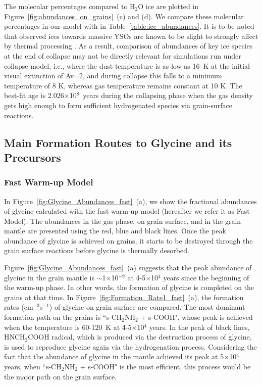 \documentclass{aastex61}
\begin{document}
The molecular percentages compared to H$_2$O ice are plotted in Figure~\ref{fig:abundances_on_grains}~(c) and (d).
%
We compare these molecular percentages in our model with \cite{Boogert15} in Table~\ref{table:ice_abundances}.
%
It is to be noted that observed ices towards massive YSOs are known to be slight to strongly affect by thermal processing \cite{Boogert15}.
%
As a result, comparison of abundances of key ice species at the end of collapse may not be directly relevant for simulations run under collapse model, i.e., where the dust temperature is as low as 16~K at the initial visual extinction of Av=2, and during collapse this falls to a minimum temperature of 8 K, whereas gas temperature remains constant at 10 K.
%
The best-fit age is 2.026$\times$10$^8$~years during the collapsing phase when the gas density gets high enough to form sufficient hydrogenated species via grain-surface reactions.






\subsection{Main Formation Routes to Glycine and its Precursors}
\subsubsection{Fast Warm-up Model}
%
In Figure~\ref{fig:Glycine_Abundances_fast}~(a), we show the fractional abundances of glycine calculated with the fast warm-up model (hereafter we refer it as Fast Model).
%
The abundances in the gas phase, on grain surface, and in the grain mantle are presented using the red, blue and black lines.
%
Once the peak abundance of glycine is achieved on grains, it starts to be destroyed through the grain surface reactions before glycine is thermally desorbed.
%

Figure~\ref{fig:Glycine_Abundances_fast}~(a) suggests that the peak abundance of glycine in the grain mantle is $\sim$1$\times$10$^{-9}$ at 4-5$\times$10$^{4}$ years since the beginning of the warm-up phase.
%
In other words, the formation of glycine is completed on the grains at that time.
%
In Figure~\ref{fig:Formation_Rate1_fast}~(a), the formation rates (cm$^{-3}$s$^{-1}$) of glycine on grain surface are compared.
%
The most dominant formation path on the grains is ``s-CH$_2$NH$_2$ + s-COOH", whose peak is achieved when the temperature is 60-120~K at 4-5$\times$10$^{4}$ years.
%
In the peak of black lines, HNCH$_2$COOH radical, which is produced via the destruction process of glycine, is used to reproduce glycine again via the hydrogenation process.
%
Considering the fact that the abundance of glycine in the mantle achieved its peak at 5$\times$10$^{4}$ years, when ``s-CH$_2$NH$_2$ + s-COOH" is the most efficient, this process would be the major path on the grain surface.
\end{document}
